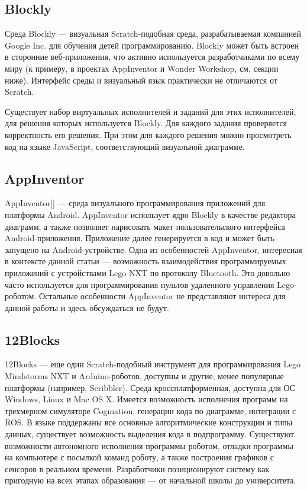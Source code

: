 \documentclass[a5paper]{article}
\begin{document}
\subsection{Blockly}

Среда Blockly --- визуальная Scratch-подобная среда, разрабатываемая компанией Google Inc. для обучения детей 
программированию. Blockly может быть встроен в сторонние веб-приложения, что активно используется разработчиками 
по всему миру (к примеру, в проектах AppInventor и Wonder Workshop, см. секции ниже). Интерфейс среды и  визуальный 
язык практически не отличаются от Scratch. 

Существует набор виртуальных исполнителей и заданий для этих исполнителей, для решения которых используется Blockly. 
Для каждого задания проверяется корректность его решения. При этом для каждого решения можно просмотреть код 
на языке JavaScript, соответствующий визуальной диаграмме.

\subsection{AppInventor}

AppInventor[] --- среда визуального программирования приложений для платформы Android. AppInventor использует ядро 
Blockly в качестве редактора диаграмм, а также позволяет нарисовать макет пользовательского интерфейса 
Android-приложения. Приложение далее генерируется в код и может быть запущено на Android-устройстве. Одна 
из особенностей AppInventor, интересная в контексте данной статьи --- возможность взаимодействия программируемых 
приложений с устройствами Lego NXT по протоколу Bluetooth. Это довольно часто используется для программирования 
пультов удаленного управления Lego-роботом. Остальные особенности AppInventor не представляют интереса для данной 
работы и здесь обсуждаться не будут.

\subsection{12Blocks}
12Blocks --- еще один Scratch-подобный инструмент для программирования Lego Mindstorms NXT и Arduino-роботов, 
доступны и другие, менее популярные платформы (например, Scribbler). Среда кроссплатформенная, доступна для 
ОС Windows, Linux и Mac OS X. Имеется возможность исполнения программ на трехмерном симуляторе Cogmation, 
генерации кода по диаграмме, интеграции с ROS. В языке поддержаны все основные алгоритмические конструкции и 
типы данных, существует возможность выделения кода в подпрограмму. Существуют возможности автономного исполнения 
программы роботом, отладки программы на компьютере с посылкой команд роботу, а также построения графиков с 
сенсоров в реальном времени. Разработчики позиционируют систему как пригодную на всех этапах образования --- от 
начальной школы до университета.
\end{document}
